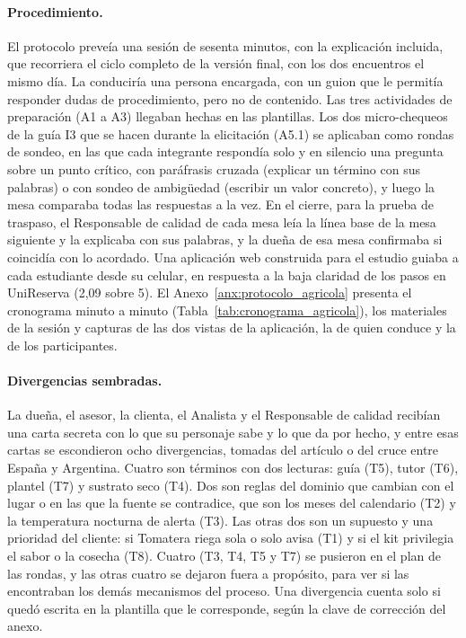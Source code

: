 \documentclass[12pt,letterpaper,oneside]{report}
\begin{document}
\paragraph{Procedimiento.}
El protocolo preveía una sesión de sesenta minutos, con la explicación incluida,
que recorriera el ciclo completo de la versión final, con los dos encuentros el
mismo día. La conduciría una persona encargada, con un guion que le permitía
responder dudas de procedimiento, pero no de contenido. Las tres actividades de preparación (A1 a
A3) llegaban hechas en las plantillas. Los dos
micro-chequeos de la guía I3 que se hacen durante la elicitación (A5.1) se
aplicaban como rondas de sondeo, en las que cada integrante respondía solo y en
silencio una pregunta sobre un punto crítico, con paráfrasis cruzada (explicar
un término con sus palabras) o con sondeo de ambigüedad (escribir un valor
concreto), y luego la mesa comparaba todas las respuestas a la vez. En el
cierre, para la prueba de traspaso, el Responsable de calidad de cada mesa leía
la línea base de la mesa siguiente y la explicaba con sus palabras, y la dueña
de esa mesa confirmaba si coincidía con lo acordado. Una aplicación web
construida para el estudio guiaba a cada estudiante desde su celular, en
respuesta a la baja claridad de los pasos en UniReserva (2,09 sobre 5). El
Anexo~\ref{anx:protocolo_agricola} presenta el cronograma minuto a minuto
(Tabla~\ref{tab:cronograma_agricola}), los materiales de la sesión y capturas de
las dos vistas de la aplicación, la de quien conduce y la de los participantes.

\paragraph{Divergencias sembradas.}
La dueña, el asesor, la clienta, el Analista y el Responsable de calidad
recibían una carta secreta con lo que su personaje sabe y lo que da por hecho, y
entre esas cartas se escondieron ocho divergencias, tomadas del artículo o del
cruce entre España y Argentina. Cuatro son términos con dos lecturas: guía (T5),
tutor (T6), plantel (T7) y sustrato seco (T4). Dos son reglas del dominio que
cambian con el lugar o en las que la fuente se contradice, que son los meses del
calendario (T2) y la temperatura nocturna de alerta (T3). Las otras dos son un
supuesto y una prioridad del cliente: si Tomatera riega sola o solo avisa (T1) y
si el kit privilegia el sabor o la cosecha (T8). Cuatro (T3, T4, T5 y T7) se
pusieron en el plan de las rondas, y las otras cuatro se dejaron fuera a
propósito, para ver si las encontraban los demás mecanismos del proceso. Una
divergencia cuenta solo si quedó escrita en la plantilla que le corresponde,
según la clave de corrección del anexo.
\end{document}
